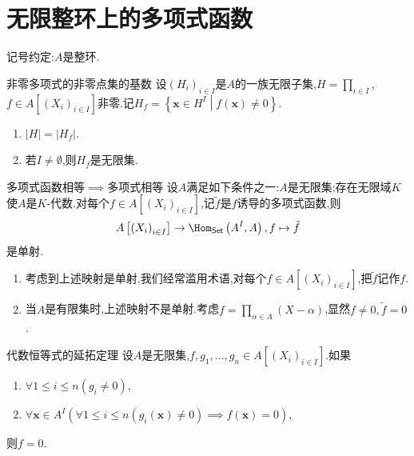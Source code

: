 \section{无限整环上的多项式函数}

记号约定:$A$是整环.

\begin{proposition}{非零多项式的非零点集的基数}{}
	设$\left(H_{i}\right)_{i\in I}$是$A$的一族无限子集,$H=\prod\limits_{i\in I}$,$f\in A\left[\left(X_{i}\right)_{i\in I}\right]$非零.记$H_{f}=\left\{\mathbf{x}\in H^{I}\middle|f\left(\mathbf{x}\right)\neq 0\right\}$.
	\begin{enumerate}
		\item $\left|H\right|=\left|H_{f}\right|$.
		\item 若$I\neq\emptyset$,则$H_{f}$是无限集.
	\end{enumerate}
\end{proposition}

\begin{corollary}{多项式函数相等$\implies$多项式相等}{}
	设$A$满足如下条件之一:$A$是无限集;存在无限域$K$使$A$是$K$-代数.对每个$f\in A\left[\left(X_{i}\right)_{i\in I}\right]$,记$\tilde{f}$是$f$诱导的多项式函数,则
	\begin{align*}
		A\left[\left(X_{i}\right)_{i\in I}\right]\to\Hom_{\mathsf{Set}}\left(A^{I},A\right),f\mapsto\tilde{f}
	\end{align*}
	是单射.
\end{corollary}

\begin{remark}{}{}
	\begin{enumerate}
		\item 考虑到上述映射是单射,我们经常滥用术语,对每个$f\in A\left[\left(X_{i}\right)_{i\in I}\right]$,把$\tilde{f}$记作$f$.
		\item 当$A$是有限集时,上述映射不是单射.考虑$f=\prod\limits_{\alpha\in A}\left(X-\alpha\right)$,显然$f\neq 0,\tilde{f}=0$.
	\end{enumerate}
\end{remark}

\begin{theorem}{代数恒等式的延拓定理}{}
	设$A$是无限集,$f,g_{1},\ldots,g_{n}\in A\left[\left(X_{i}\right)_{i\in I}\right]$.如果
	\begin{enumerate}
		\item $\forall 1\leq i\leq n\left(g_{i}\neq 0\right)$,
		\item $\forall\mathbf{x}\in A^{I}\left(\forall 1\leq i\leq n\left(g_{i}\left(\mathbf{x}\right)\neq 0\right)\implies f\left(\mathbf{x}\right)=0\right)$,
	\end{enumerate}
	则$f=0$.
\end{theorem}

